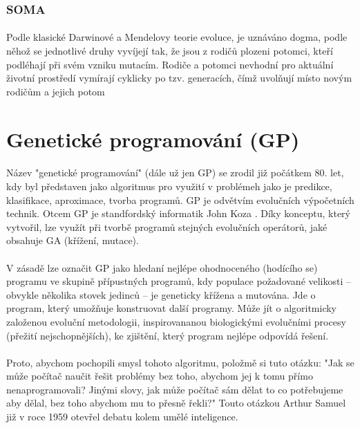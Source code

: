 \documentclass[bc,male,java,dept460]{diploma}		%
\begin{document}
\subsubsection{SOMA}
\paragraph*{}
Podle klasické Darwinové a Mendelovy teorie evoluce, je uznáváno dogma, podle něhož se jednotlivé druhy vyvíjejí tak, že jsou z rodičů plozeni potomci, kteří podléhají při svém vzniku mutacím. Rodiče a potomci nevhodní pro aktuální životní prostředí vymírají cyklicky po tzv. generacích, čímž uvolňují místo novým rodičům a jejich potom

\section{Genetické programování (GP)}
\paragraph*{}
Název "genetické programování" (dále už jen GP) se zrodil již počátkem 80. let, kdy byl představen jako algoritmus pro využití v problémeh jako je predikce, klasifikace, aproximace, tvorba programů. GP je odvětvím evolučních výpočetních technik.
Otcem GP je standfordský informatik John Koza \cite{kozagp,kozagp2}. Díky konceptu, který vytvořil, lze využít při tvorbě programů stejných evolučních operátorů, jaké obsahuje GA (křížení, mutace).

\paragraph*{}
V zásadě lze označit GP jako hledaní nejlépe ohodnoceného (hodícího se) programu ve skupině přípustných programů, kdy populace požadované velikosti – obvykle několika stovek jedinců – je geneticky křížena a mutována.
Jde o program, který umožňuje konstruovat další programy. Může jít o algoritmicky založenou evoluční metodologii, inspirovananou biologickými evolučními procesy (přežití nejschopnějších), ke zjištění, který program nejlépe odpovídá řešení.

\paragraph*{}
Proto, abychom pochopili smysl tohoto algoritmu, položmě si tuto otázku: "Jak se může počítač naučit řešit  problémy bez toho, abychom jej k tomu přímo nenaprogramovali? Jinými slovy, jak může počítač sám dělat to co potřebujeme aby dělal, bez toho abychom mu to přesně řekli?" Touto otázkou Arthur Samuel již v roce 1959 otevřel debatu kolem umělé inteligence.
\end{document}
